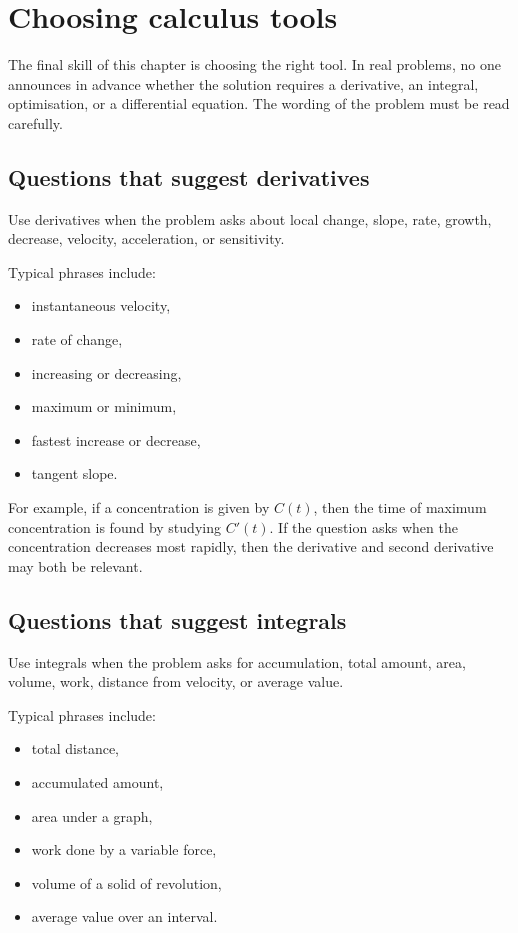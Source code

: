 \section{Choosing calculus tools}

The final skill of this chapter is choosing the right tool. In real problems, no one announces in advance whether the solution requires a derivative, an integral, optimisation, or a differential equation. The wording of the problem must be read carefully.

\subsection*{Questions that suggest derivatives}

Use derivatives when the problem asks about local change, slope, rate, growth, decrease, velocity, acceleration, or sensitivity.

Typical phrases include:
\begin{itemize}
\item instantaneous velocity,
\item rate of change,
\item increasing or decreasing,
\item maximum or minimum,
\item fastest increase or decrease,
\item tangent slope.
\end{itemize}

For example, if a concentration is given by \(C(t)\), then the time of maximum concentration is found by studying \(C'(t)\). If the question asks when the concentration decreases most rapidly, then the derivative and second derivative may both be relevant.

\subsection*{Questions that suggest integrals}

Use integrals when the problem asks for accumulation, total amount, area, volume, work, distance from velocity, or average value.

Typical phrases include:
\begin{itemize}
\item total distance,
\item accumulated amount,
\item area under a graph,
\item work done by a variable force,
\item volume of a solid of revolution,
\item average value over an interval.
\end{itemize}

